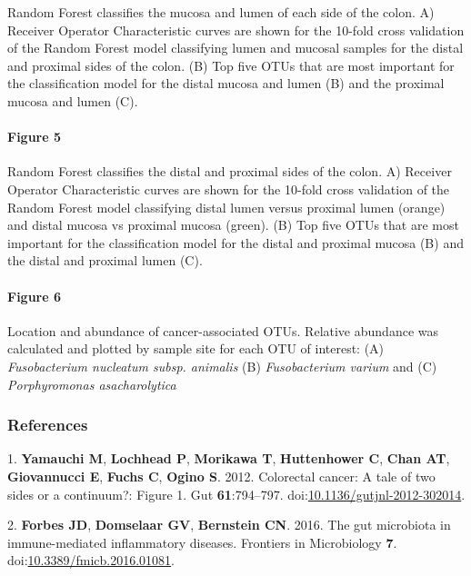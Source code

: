 \documentclass[11pt,]{article}
\let\oldparagraph\paragraph
\renewcommand{\paragraph}[1]{\oldparagraph{#1}\mbox{}}
\begin{document}
Random Forest classifies the mucosa and lumen of each side of the colon.
A) Receiver Operator Characteristic curves are shown for the 10-fold
cross validation of the Random Forest model classifying lumen and
mucosal samples for the distal and proximal sides of the colon. (B) Top
five OTUs that are most important for the classification model for the
distal mucosa and lumen (B) and the proximal mucosa and lumen (C).

\newpage

\paragraph{Figure 5}\label{figure-5}

Random Forest classifies the distal and proximal sides of the colon. A)
Receiver Operator Characteristic curves are shown for the 10-fold cross
validation of the Random Forest model classifying distal lumen versus
proximal lumen (orange) and distal mucosa vs proximal mucosa (green).
(B) Top five OTUs that are most important for the classification model
for the distal and proximal mucosa (B) and the distal and proximal lumen
(C).

\newpage

\paragraph{Figure 6}\label{figure-6}

Location and abundance of cancer-associated OTUs. Relative abundance was
calculated and plotted by sample site for each OTU of interest: (A)
\emph{Fusobacterium nucleatum subsp. animalis} (B) \emph{Fusobacterium
varium} and (C) \emph{Porphyromonas asacharolytica}

\subsubsection*{References}\label{references}

\hypertarget{refs}{}
\hypertarget{ref-Yamauchi2012}{}
1. \textbf{Yamauchi M}, \textbf{Lochhead P}, \textbf{Morikawa T},
\textbf{Huttenhower C}, \textbf{Chan AT}, \textbf{Giovannucci E},
\textbf{Fuchs C}, \textbf{Ogino S}. 2012. Colorectal cancer: A tale of
two sides or a continuum?: Figure 1. Gut \textbf{61}:794--797.
doi:\href{https://doi.org/10.1136/gutjnl-2012-302014}{10.1136/gutjnl-2012-302014}.

\hypertarget{ref-Forbes2016}{}
2. \textbf{Forbes JD}, \textbf{Domselaar GV}, \textbf{Bernstein CN}.
2016. The gut microbiota in immune-mediated inflammatory diseases.
Frontiers in Microbiology \textbf{7}.
doi:\href{https://doi.org/10.3389/fmicb.2016.01081}{10.3389/fmicb.2016.01081}.
\end{document}
